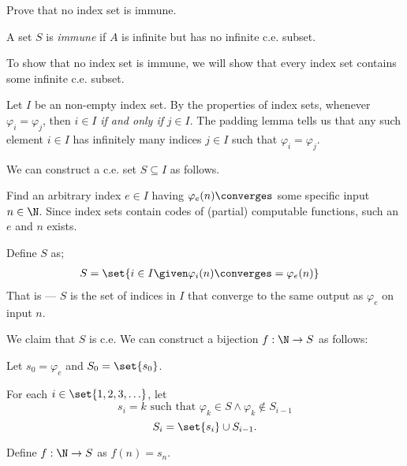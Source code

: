 \begin{problem}
  Prove that no index set is immune.


  \begin{answer}
    A set $S$ is \emph{immune} if $A$ is infinite but has no
    infinite c.e. subset.

    To show that no index set is immune, we will show that every index set
    contains some infinite c.e. subset.

    Let $I$ be an non-empty index set.
    By the properties of index sets,
    whenever $\varphi_i = \varphi_j$, then $i \in I$
    \emph{if and only if} $j \in I$.
    The padding lemma tells us that any such element $i \in I$
    has infinitely many indices $j \in I$ such that
    $\varphi_i = \varphi_j$.

    We can construct a c.e. set $S \subseteq I$ as follows.

    \begin{enumarabic}
      \item Find an arbitrary index $e \in I$ having
        $\varphi_e(n) \converges$ some specific input $n \in \N$.
        Since index sets contain codes of (partial) computable functions,
        such an $e$ and $n$ exists.
      \item Define $S$ as;
        \begin{align*}
          S &= \set{ i \in I \given \varphi_i(n) \converges = \varphi_e(n) }
        \end{align*}
        That is --- $S$ is the set of indices in $I$ that converge to the same
        output as $\varphi_e$ on input $n$.

      \item We claim that $S$ is c.e.
        We can construct a bijection $f : \N \to S$ as follows:
        \begin{enumroman}
          \item Let $s_0 = \varphi_e$ and $S_0 = \set{ s_0 }$.
          \item For each $i \in \set{1, 2, 3, \ldots}$,
            let \[ s_i = k \text{ such that } \varphi_k \in S \land \varphi_k \not \in S_{i-1} \]
             \[ S_i = \set{ s_i } \cup S_{i-1}.\]
          \item Define $f : \N \to S$ as $f(n) = s_n$.
        \end{enumroman}
    \end{enumarabic}
  \end{answer}
\end{problem}
